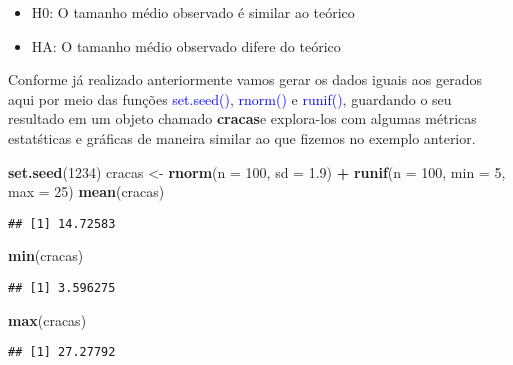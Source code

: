 \documentclass[14pt,titlepage, oneside, openany, a4paper]{book}
\newenvironment{Shaded}{\begin{snugshade}}{\end{snugshade}}
\newcommand{\DataTypeTok}[1]{\textcolor[rgb]{0.13,0.29,0.53}{#1}}
\newcommand{\DecValTok}[1]{\textcolor[rgb]{0.00,0.00,0.81}{#1}}
\newcommand{\FloatTok}[1]{\textcolor[rgb]{0.00,0.00,0.81}{#1}}
\newcommand{\KeywordTok}[1]{\textcolor[rgb]{0.13,0.29,0.53}{\textbf{#1}}}
\newcommand{\NormalTok}[1]{#1}
\newcommand{\OperatorTok}[1]{\textcolor[rgb]{0.81,0.36,0.00}{\textbf{#1}}}
\newcommand{\StringTok}[1]{\textcolor[rgb]{0.31,0.60,0.02}{#1}}
\providecommand{\tightlist}{%
  \setlength{\itemsep}{0pt}\setlength{\parskip}{0pt}}
\begin{document}
\begin{itemize}
\tightlist
\item
  H0: O tamanho médio observado é similar ao teórico
\item
  HA: O tamanho médio observado difere do teórico
\end{itemize}

Conforme já realizado anteriormente vamos gerar os dados iguais aos gerados aqui por meio das funções \textcolor{blue}{set.seed()}, \textcolor{blue}{rnorm()} e \textcolor{blue}{runif()}, guardando o seu resultado em um objeto chamado \textbf{cracas}e explora-los com algumas métricas estatśticas e gráficas de maneira similar ao que fizemos no exemplo anterior.

\begin{Shaded}
\begin{Highlighting}[]
\KeywordTok{set.seed}\NormalTok{(}\DecValTok{1234}\NormalTok{)}
\NormalTok{cracas <-}\StringTok{ }\KeywordTok{rnorm}\NormalTok{(}\DataTypeTok{n =} \DecValTok{100}\NormalTok{, }\DataTypeTok{sd =} \FloatTok{1.9}\NormalTok{) }\OperatorTok{+}\StringTok{ }\KeywordTok{runif}\NormalTok{(}\DataTypeTok{n =} \DecValTok{100}\NormalTok{, }\DataTypeTok{min =} \DecValTok{5}\NormalTok{, }\DataTypeTok{max =} \DecValTok{25}\NormalTok{)}
\KeywordTok{mean}\NormalTok{(cracas)}
\end{Highlighting}
\end{Shaded}

\begin{verbatim}
## [1] 14.72583
\end{verbatim}

\begin{Shaded}
\begin{Highlighting}[]
\KeywordTok{min}\NormalTok{(cracas)}
\end{Highlighting}
\end{Shaded}

\begin{verbatim}
## [1] 3.596275
\end{verbatim}

\begin{Shaded}
\begin{Highlighting}[]
\KeywordTok{max}\NormalTok{(cracas)}
\end{Highlighting}
\end{Shaded}

\begin{verbatim}
## [1] 27.27792
\end{verbatim}
\end{document}
